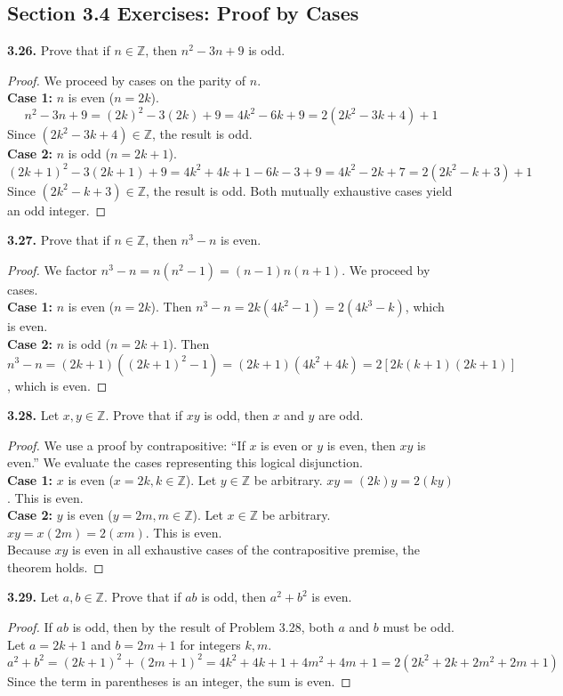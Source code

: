 \documentclass[11pt]{article}
\begin{document}
\subsection{Section 3.4 Exercises: Proof by Cases}

\textbf{3.26.} Prove that if $n \in \mathbb{Z}$, then $n^2 - 3n + 9$ is odd.
\begin{proof}
We proceed by cases on the parity of $n$. \\
\textbf{Case 1:} $n$ is even ($n = 2k$). 
\[ n^2 - 3n + 9 = (2k)^2 - 3(2k) + 9 = 4k^2 - 6k + 9 = 2(2k^2 - 3k + 4) + 1 \]
Since $(2k^2 - 3k + 4) \in \mathbb{Z}$, the result is odd. \\
\textbf{Case 2:} $n$ is odd ($n = 2k + 1$).
\[ (2k + 1)^2 - 3(2k + 1) + 9 = 4k^2 + 4k + 1 - 6k - 3 + 9 = 4k^2 - 2k + 7 = 2(2k^2 - k + 3) + 1 \]
Since $(2k^2 - k + 3) \in \mathbb{Z}$, the result is odd. Both mutually exhaustive cases yield an odd integer.
\end{proof}

\textbf{3.27.} Prove that if $n \in \mathbb{Z}$, then $n^3 - n$ is even.
\begin{proof}
We factor $n^3 - n = n(n^2 - 1) = (n-1)n(n+1)$. We proceed by cases. \\
\textbf{Case 1:} $n$ is even ($n = 2k$). Then $n^3 - n = 2k(4k^2 - 1) = 2(4k^3 - k)$, which is even. \\
\textbf{Case 2:} $n$ is odd ($n = 2k + 1$). Then $n^3 - n = (2k + 1)((2k + 1)^2 - 1) = (2k + 1)(4k^2 + 4k) = 2[2k(k + 1)(2k + 1)]$, which is even.
\end{proof}

\textbf{3.28.} Let $x, y \in \mathbb{Z}$. Prove that if $xy$ is odd, then $x$ and $y$ are odd.
\begin{proof}
We use a proof by contrapositive: ``If $x$ is even or $y$ is even, then $xy$ is even.'' We evaluate the cases representing this logical disjunction. \\
\textbf{Case 1:} $x$ is even ($x = 2k, k \in \mathbb{Z}$). Let $y \in \mathbb{Z}$ be arbitrary. $xy = (2k)y = 2(ky)$. This is even. \\
\textbf{Case 2:} $y$ is even ($y = 2m, m \in \mathbb{Z}$). Let $x \in \mathbb{Z}$ be arbitrary. $xy = x(2m) = 2(xm)$. This is even. \\
Because $xy$ is even in all exhaustive cases of the contrapositive premise, the theorem holds.
\end{proof}

\textbf{3.29.} Let $a, b \in \mathbb{Z}$. Prove that if $ab$ is odd, then $a^2 + b^2$ is even.
\begin{proof}
If $ab$ is odd, then by the result of Problem 3.28, both $a$ and $b$ must be odd. Let $a = 2k + 1$ and $b = 2m + 1$ for integers $k, m$.
\[ a^2 + b^2 = (2k + 1)^2 + (2m + 1)^2 = 4k^2 + 4k + 1 + 4m^2 + 4m + 1 = 2(2k^2 + 2k + 2m^2 + 2m + 1) \]
Since the term in parentheses is an integer, the sum is even.
\end{proof}
\end{document}
